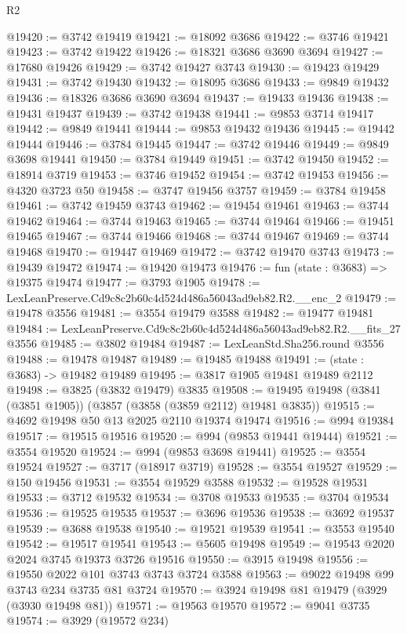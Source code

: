 \begin{lexlean}{R2}
\begin{coremodule}
@19420 := @3742 @19419
@19421 := @18092 @3686
@19422 := @3746 @19421
@19423 := @3742 @19422
@19426 := @18321 @3686 @3690 @3694
@19427 := @17680 @19426
@19429 := @3742 @19427 @3743
@19430 := @19423 @19429
@19431 := @3742 @19430
@19432 := @18095 @3686
@19433 := @9849 @19432
@19436 := @18326 @3686 @3690 @3694
@19437 := @19433 @19436
@19438 := @19431 @19437
@19439 := @3742 @19438
@19441 := @9853 @3714 @19417
@19442 := @9849 @19441
@19444 := @9853 @19432 @19436
@19445 := @19442 @19444
@19446 := @3784 @19445
@19447 := @3742 @19446
@19449 := @9849 @3698 @19441
@19450 := @3784 @19449
@19451 := @3742 @19450
@19452 := @18914 @3719
@19453 := @3746 @19452
@19454 := @3742 @19453
@19456 := @4320 @3723 @50
@19458 := @3747 @19456 @3757
@19459 := @3784 @19458
@19461 := @3742 @19459 @3743
@19462 := @19454 @19461
@19463 := @3744 @19462
@19464 := @3744 @19463
@19465 := @3744 @19464
@19466 := @19451 @19465
@19467 := @3744 @19466
@19468 := @3744 @19467
@19469 := @3744 @19468
@19470 := @19447 @19469
@19472 := @3742 @19470 @3743
@19473 := @19439 @19472
@19474 := @19420 @19473
@19476 := fun (state : @3683) => @19375 @19474
@19477 := @3793 @1905
@19478 := LexLeanPreserve.Cd9c8c2b60c4d524d486a56043ad9eb82.R2.__enc_2
@19479 := @19478 @3556
@19481 := @3554 @19479 @3588
@19482 := @19477 @19481
@19484 := LexLeanPreserve.Cd9c8c2b60c4d524d486a56043ad9eb82.R2.__fits_27 @3556
@19485 := @3802 @19484
@19487 := LexLeanStd.Sha256.round @3556
@19488 := @19478 @19487
@19489 := @19485 @19488
@19491 := (state : @3683) -> @19482 @19489
@19495 := @3817 @1905 @19481 @19489 @2112
@19498 := @3825 (@3832 @19479) @3835
@19508 := @19495 @19498 (@3841 (@3851 @1905)) (@3857 (@3858 (@3859 @2112) @19481 @3835))
@19515 := @4692 @19498 @50 @13 @2025 @2110 @19374 @19474
@19516 := @994 @19384
@19517 := @19515 @19516
@19520 := @994 (@9853 @19441 @19444)
@19521 := @3554 @19520
@19524 := @994 (@9853 @3698 @19441)
@19525 := @3554 @19524
@19527 := @3717 (@18917 @3719)
@19528 := @3554 @19527
@19529 := @150 @19456
@19531 := @3554 @19529 @3588
@19532 := @19528 @19531
@19533 := @3712 @19532
@19534 := @3708 @19533
@19535 := @3704 @19534
@19536 := @19525 @19535
@19537 := @3696 @19536
@19538 := @3692 @19537
@19539 := @3688 @19538
@19540 := @19521 @19539
@19541 := @3553 @19540
@19542 := @19517 @19541
@19543 := @5605 @19498
@19549 := @19543 @2020 @2024 @3745 @19373 @3726 @19516
@19550 := @3915 @19498
@19556 := @19550 @2022 @101 @3743 @3743 @3724 @3588
@19563 := @9022 @19498 @99 @3743 @234 @3735 @81 @3724
@19570 := @3924 @19498 @81 @19479 (@3929 (@3930 @19498 @81))
@19571 := @19563 @19570
@19572 := @9041 @3735
@19574 := @3929 (@19572 @234)

\end{coremodule}
\end{lexlean}
